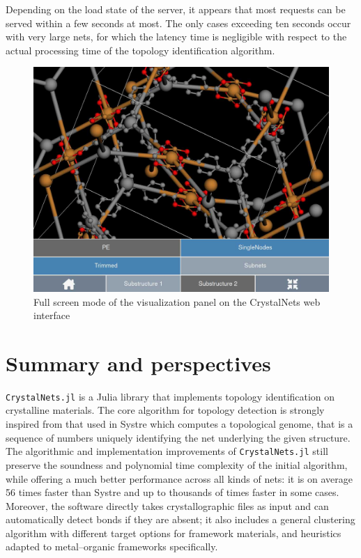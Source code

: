 \documentclass[main.tex]{subfiles}
\begin{document}
Depending on the load state of the server, it appears that most requests can be served within a few seconds at most. The only cases exceeding ten seconds occur with very large nets, for which the latency time is negligible with respect to the actual processing time of the topology identification algorithm.

\begin{figure}
	\centering
	\includegraphics[width=0.9\linewidth]{figures/topology/WebsiteFullscreen.jpg}
	\caption{Full screen mode of the visualization panel on the CrystalNets web interface}\label{fig:visualization}
\end{figure}

\section{Summary and perspectives}

\texttt{CrystalNets.jl} is a Julia library that implements topology identification on crystalline materials. The core algorithm for topology detection is strongly inspired from that used in Systre \autocite{Systre} which computes a topological genome, that is a sequence of numbers uniquely identifying the net underlying the given structure. The algorithmic and implementation improvements of \texttt{CrystalNets.jl} still preserve the soundness and polynomial time complexity of the initial algorithm, while offering a much better performance across all kinds of nets: it is on average 56 times faster than Systre and up to thousands of times faster in some cases. Moreover, the software directly takes crystallographic files as input and can automatically detect bonds if they are absent; it also includes a general clustering algorithm with different target options for framework materials, and heuristics adapted to metal--organic frameworks specifically.
\end{document}
